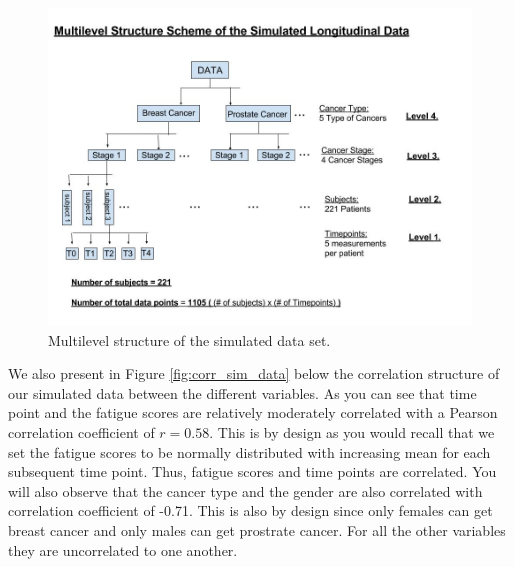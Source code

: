 \documentclass[fleqn,10pt]{wlscirep}\usepackage[]{graphicx}\usepackage[]{color}
\begin{document}
\begin{figure}[H]
\centering
\includegraphics[width=\linewidth]{sim_data_structure_scheme}
\caption{Multilevel structure of the simulated data set.}
\label{fig:sim_data_structure_scheme}
\end{figure}

We also present in Figure \ref{fig:corr_sim_data} below the correlation structure of our simulated data between the different variables. As you can see that time point and the fatigue scores are relatively moderately correlated with a Pearson correlation coefficient of $r=0.58$. This is by design as you would recall that we set the fatigue scores to be normally distributed with increasing mean for each subsequent time point. Thus, fatigue scores and time points are correlated. You will also observe that the cancer type and the gender are also correlated with correlation coefficient of -0.71. This is also by design since only females can get breast cancer and only males can get prostrate cancer. For all the other variables they are uncorrelated to one another. 
\end{document}
